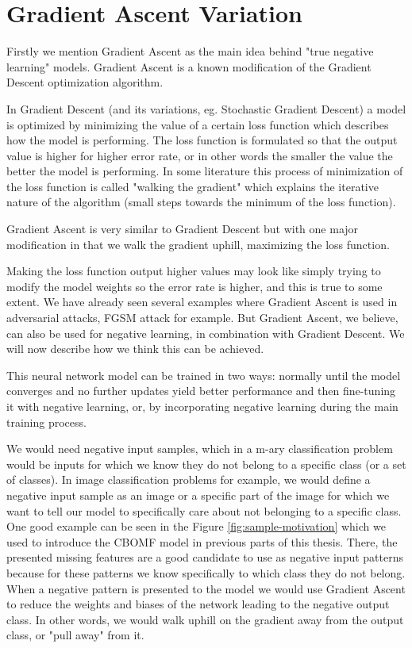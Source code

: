 \documentclass[b5paper]{book}
\begin{document}
\section{Gradient Ascent Variation}

Firstly we mention Gradient Ascent as the main idea behind "true negative learning" models. Gradient Ascent is a known modification of the Gradient Descent optimization algorithm. 

In Gradient Descent (and its variations, eg. Stochastic Gradient Descent) a model is optimized by minimizing the value of a certain loss function which describes how the model is performing. The loss function is formulated so that the output value is higher for higher error rate, or in other words the smaller the value the better the model is performing. In some literature this process of minimization of the loss function is called "walking the gradient" which explains the iterative nature of the algorithm (small steps towards the minimum of the loss function).

Gradient Ascent is very similar to Gradient Descent but with one major modification in that we walk the gradient uphill, maximizing the loss function. 

Making the loss function output higher values may look like simply trying to modify the model weights so the error rate is higher, and this is true to some extent. We have already seen several examples where Gradient Ascent is used in adversarial attacks, FGSM attack for example. But Gradient Ascent, we believe, can also be used for negative learning, in combination with Gradient Descent. We will now describe how we think this can be achieved.

This neural network model can be trained in two ways: normally until the model converges and no further updates yield better performance and then fine-tuning it with negative learning, or, by incorporating negative learning during the main training process. 

We would need negative input samples, which in a m-ary classification problem would be inputs for which we know they do not belong to a specific class (or a set of classes). In image classification problems for example, we would define a negative input sample as an image or a specific part of the image for which we want to tell our model to specifically care about not belonging to a specific class. One good example can be seen in the Figure \ref{fig:sample-motivation} which we used to introduce the CBOMF model in previous parts of this thesis. There, the presented missing features are a good candidate to use as negative input patterns because for these patterns we know specifically to which class they do not belong. When a negative pattern is presented to the model we would use Gradient Ascent to reduce the weights and biases of the network leading to the negative output class. In other words, we would walk uphill on the gradient away from the output class, or "pull away" from it. 
\end{document}
